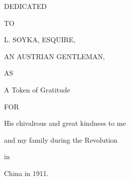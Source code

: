 \documentclass[10pt,letterpaper,extrafontsizes]{memoir}
\begin{document}
\begin{center}
  \HUGE\textsc{DEDICATED}\par

\vspace*{\fill}

  \Large{TO} \par

\vspace*{\fill}

  \HUGE\textsf{L. SOYKA, ESQUIRE,}

  \medskip

  \LARGE{AN AUSTRIAN GENTLEMAN,} \par

\vspace*{\fill}

  \Large{AS} \par

\vspace*{\fill}

  \LARGE{A Token of Gratitude} \par

\vspace*{\fill}

  \Large{FOR} \par

\vspace*{\fill}

  \LARGE{His chivalrous and great kindness to me} \par

  \medskip

  \LARGE{and my family during the Revolution} \par

  \medskip

  \LARGE{in} \par

  \medskip

  \LARGE{China in 1911.} \par

  \medskip

\end{center}


\clearpage


\pagestyle{headings}

\setupshorttoc
\tableofcontents
\clearpage
\setupparasubsecs
\setupmaintoc
\tableofcontents
\end{document}
